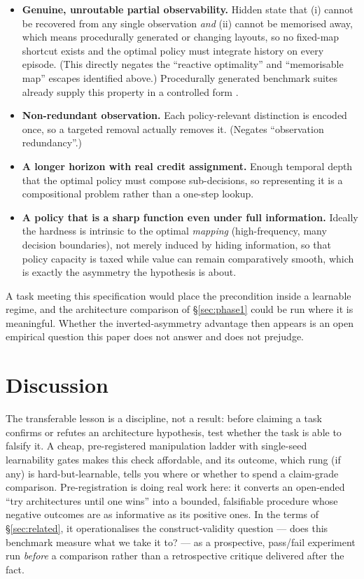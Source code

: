 \documentclass[10pt]{article}
\begin{document}
\begin{itemize}
\item \textbf{Genuine, unroutable partial observability.} Hidden state that (i) cannot be
  recovered from any single observation \emph{and} (ii) cannot be memorised away, which means
  procedurally generated or changing layouts, so no fixed-map shortcut exists and the optimal
  policy must integrate history on every episode. (This directly negates the ``reactive
  optimality'' and ``memorisable map'' escapes identified above.) Procedurally generated
  benchmark suites already supply this property in a controlled form
  \citep{cobbe2020procgen,chevalier2023minigrid}.
\item \textbf{Non-redundant observation.} Each policy-relevant distinction is encoded once, so
  a targeted removal actually removes it. (Negates ``observation redundancy''.)
\item \textbf{A longer horizon with real credit assignment.} Enough temporal depth that the
  optimal policy must compose sub-decisions, so representing it is a compositional problem
  rather than a one-step lookup.
\item \textbf{A policy that is a sharp function even under full information.} Ideally the
  hardness is intrinsic to the optimal \emph{mapping} (high-frequency, many decision
  boundaries), not merely induced by hiding information, so that policy capacity is taxed
  while value can remain comparatively smooth, which is exactly the asymmetry the hypothesis
  is about.
\end{itemize}

A task meeting this specification would place the precondition inside a learnable regime, and
the architecture comparison of \S\ref{sec:phase1} could be run where it is meaningful.
Whether the inverted-asymmetry advantage then appears is an open empirical question this
paper does not answer and does not prejudge.

\section{Discussion}
\label{sec:discussion}

The transferable lesson is a discipline, not a result: before claiming a task confirms
or refutes an architecture hypothesis, test whether the task is able to falsify it. A cheap,
pre-registered manipulation ladder with single-seed learnability gates makes this check
affordable, and its outcome, which rung (if any) is hard-but-learnable, tells you where or
whether to spend a claim-grade comparison. Pre-registration is doing real work here: it
converts an open-ended ``try architectures until one wins'' into a bounded, falsifiable
procedure whose negative outcomes are as informative as its positive ones. In the terms of
\S\ref{sec:related}, it operationalises the construct-validity question --- does this
benchmark measure what we take it to? --- as a prospective, pass/fail experiment run
\emph{before} a comparison rather than a retrospective critique delivered after the fact.
\end{document}
